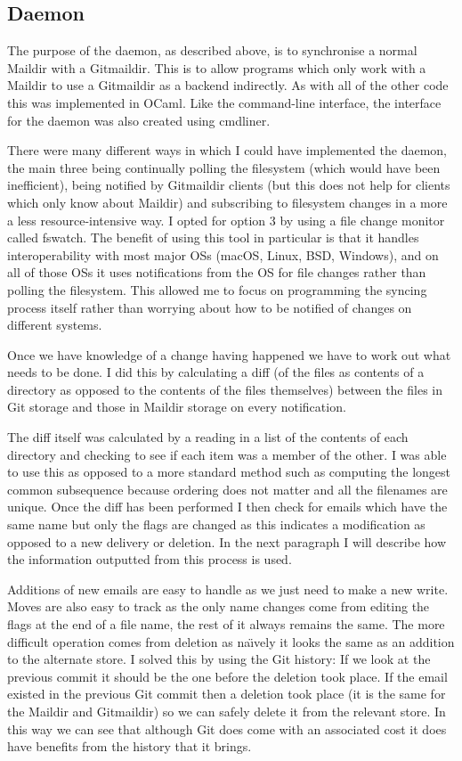 \subsection{Daemon}

The purpose of the daemon, as described above, is to synchronise a normal Maildir with a Gitmaildir. This is to allow programs which only work with a Maildir to use a Gitmaildir as a backend indirectly. As with all of the other code this was implemented in OCaml. Like the command-line interface, the interface for the daemon was also created using cmdliner.

There were many different ways in which I could have implemented the daemon, the main three being continually polling the filesystem (which would have been inefficient), being notified by Gitmaildir clients (but this does not help for clients which only know about Maildir) and subscribing to filesystem changes in a more a less resource-intensive way. I opted for option 3 by using a file change monitor called fswatch\cite{code_fswatch}. The benefit of using this tool in particular is that it handles interoperability with most major OSs (macOS, Linux, BSD, Windows), and on all of those OSs it uses notifications from the OS for file changes rather than polling the filesystem. This allowed me to focus on programming the syncing process itself rather than worrying about how to be notified of changes on different systems.

Once we have knowledge of a change having happened we have to work out what needs to be done. I did this by calculating a diff (of the files as contents of a directory as opposed to the contents of the files themselves) between the files in Git storage and those in Maildir storage on every notification.

The diff itself was calculated by a reading in a list of the contents of each directory and checking to see if each item was a member of the other. I was able to use this as opposed to a more standard method such as computing the longest common subsequence because ordering does not matter and all the filenames are unique. Once the diff has been performed I then check for emails which have the same name but only the flags are changed as this indicates a modification as opposed to a new delivery or deletion. In the next paragraph I will describe how the information outputted from this process is used.

Additions of new emails are easy to handle as we just need to make a new write. Moves are also easy to track as the only name changes come from editing the flags at the end of a file name, the rest of it always remains the same. The more difficult operation comes from deletion as na\"{\i}vely it looks the same as an addition to the alternate store. I solved this by using the Git history: If we look at the previous commit it should be the one before the deletion took place. If the email existed in the previous Git commit then a deletion took place (it is the same for the Maildir and Gitmaildir) so we can safely delete it from the relevant store. In this way we can see that although Git does come with an associated cost it does have benefits from the history that it brings.


